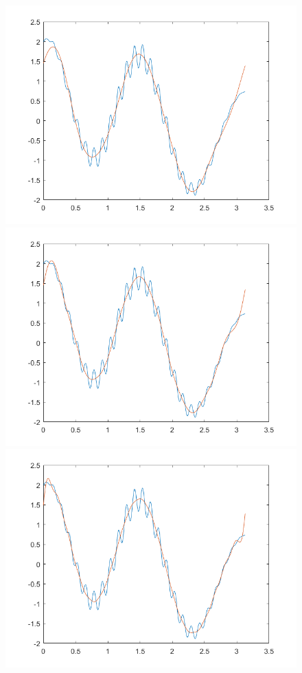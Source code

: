 \documentclass{article}
\begin{document}
\begin{figure}
	\includegraphics[scale=.5]{../res6.png}
	\includegraphics[scale=.5]{../res10.png}
	\includegraphics[scale=.5]{../res20.png}

\end{figure}
\end{document}
